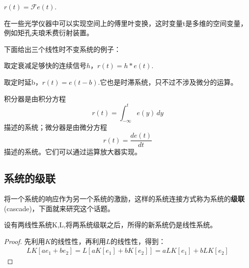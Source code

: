 \begin{example}[傅里叶变换]
$r(t)=\mathcal{F} e(t)$.

在一些光学仪器中可以实现空间上的傅里叶变换，这时变量t是多维的空间变量，例如矩孔夫琅禾费衍射装置。
\end{example}


下面给出三个线性时不变系统的例子：

\begin{example}[卷积]
    取定衰减足够快的连续信号$h$，$r(t)=h*e(t)$.
\end{example}

\begin{example}[信号平移]
    取定时延b，$r(t)=e(t-b)$.它也是时滞系统，只不过不涉及微分的运算。
\end{example}

\begin{example}[微分器与积分器]
    积分器是由积分方程$$r(t)=\int_{-\infty}^{t}e(y)\,dy$$描述的系统；微分器是由微分方程$$r(t)=\frac{de(t)}{dt}$$描述的系统。它们可以通过运算放大器实现。
\end{example}

\subsection{系统的级联}\label{sub:cascade}
将一个系统的响应作为另一个系统的激励，这样的系统连接方式称为系统的\textbf{级联}(cascade)，下面就来研究这个话题。
\begin{theorem}[线性系统的级联]
    设有两线性系统K,L,将两系统级联之后，所得的新系统仍是线性系统。
\end{theorem}
\begin{proof}
    先利用$K$的线性性，再利用$L$的线性性，得到：
    \begin{align*}
    LK[ae_1+be_2]=L[aK[e_1]+bK[e_2]]=aLK[e_1]+bLK[e_2]
\end{align*}
\end{proof}

